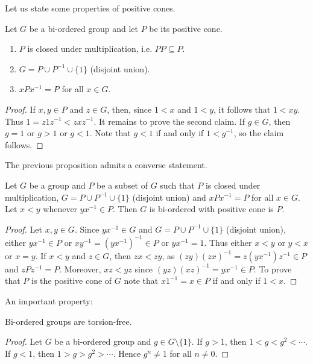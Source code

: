 Let us state some properties of positive cones. 

\begin{proposition}
	\label{pro:biordenableP1}
	Let $G$ be a bi-ordered group and let $P$ be its positive cone. 
	\begin{enumerate}
		\item $P$ is closed under multiplication, i.e. $PP\subseteq P$. 
		\item $G=P\cup P^{-1}\cup \{1\}$ (disjoint union).
		\item $xPx^{-1}=P$ for all $x\in G$.
	\end{enumerate}
\end{proposition}

\begin{proof}
	If $x,y\in P$ and $z\in G$, then, since $1<x$ and $1<y$, it follows that 
	$1<xy$.  Thus $1=z1z^{-1}<zxz^{-1}$. It remains to prove the second claim.  
	If $g\in G$, then $g=1$ or $g>1$ or $g<1$. Note that $g<1$ if and only if 
	$1<g^{-1}$, so the claim follows. 
\end{proof}

The previous proposition admits a converse statement. 

\begin{proposition}
	\label{pro:biordenableP2}
	Let $G$ be a group and $P$ be a subset of $G$ such that 
	$P$ is closed under multiplication, $G=P\cup P^{-1}\cup \{1\}$ (disjoint union) and
	$xPx^{-1}=P$ for all $x\in G$. Let $x<y$ whenever  
	$yx^{-1}\in P$. Then $G$ is bi-ordered with positive
	cone is $P$.
\end{proposition}

\begin{proof}
	Let $x,y\in G$. Since $yx^{-1}\in G$ and $G=P\cup
	P^{-1}\cup\{1\}$ (disjoint union), 
	either $yx^{-1}\in P$ or $xy^{-1}=(yx^{-1})^{-1}\in
	P$ or $yx^{-1}=1$. Thus either $x<y$ or $y<x$ or $x=y$. If $x<y$ and $z\in
	G$, then $zx<zy$, as $(zy)(zx)^{-1}=z(yx^{-1})z^{-1}\in P$ and  
	$zPz^{-1}=P$. Moreover, $xz<yz$ since $(yz)(xz)^{-1}=yx^{-1}\in P$. To prove
	that $P$ is the positive cone of $G$ note that 
	$x1^{-1}=x\in P$ if and only if $1<x$. 
\end{proof}

An important property:

\begin{proposition}
	\label{pro:BOsintorsion}
	Bi-ordered groups are torsion-free.
\end{proposition}

\begin{proof}
	Let $G$ be a bi-ordered group and $g\in G\setminus\{1\}$. 
	If $g>1$, then
	$1<g<g^2<\cdots$. If $g<1$, then $1>g>g^2>\cdots$. Hence $g^n\ne 1$ 
	for all $n\ne 0$. 
\end{proof}

